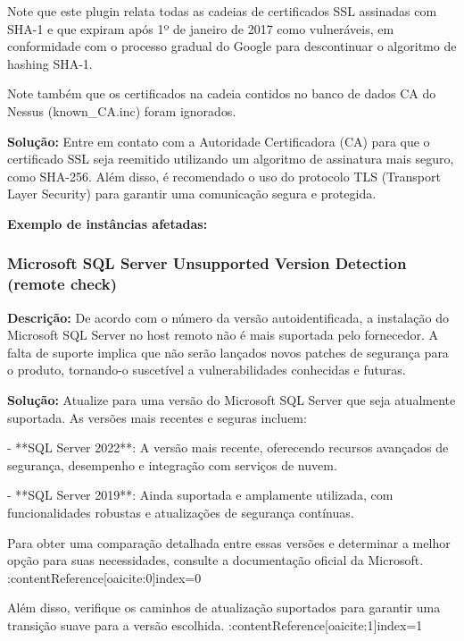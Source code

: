 \documentclass[a4paper,12pt]{article}
\begin{document}
Note que este plugin relata todas as cadeias de certificados SSL assinadas com SHA-1 e que expiram após 1º de janeiro de 2017 como vulneráveis, em conformidade com o processo gradual do Google para descontinuar o algoritmo de hashing SHA-1.

Note também que os certificados na cadeia contidos no banco de dados CA do Nessus (known_CA.inc) foram ignorados.

\textbf{Solução:}
Entre em contato com a Autoridade Certificadora (CA) para que o certificado SSL seja reemitido utilizando um algoritmo de assinatura mais seguro, como SHA-256. Além disso, é recomendado o uso do protocolo TLS (Transport Layer Security) para garantir uma comunicação segura e protegida.

\textbf{Exemplo de instâncias afetadas:}
\begin{itemize}
\end{itemize}


\subsubsection{Microsoft SQL Server Unsupported Version Detection (remote check)}

\textbf{Descrição:}  
De acordo com o número da versão autoidentificada, a instalação do Microsoft SQL Server no host remoto não é mais suportada pelo fornecedor. A falta de suporte implica que não serão lançados novos patches de segurança para o produto, tornando-o suscetível a vulnerabilidades conhecidas e futuras.

\textbf{Solução:}  
Atualize para uma versão do Microsoft SQL Server que seja atualmente suportada. As versões mais recentes e seguras incluem:

- **SQL Server 2022**: A versão mais recente, oferecendo recursos avançados de segurança, desempenho e integração com serviços de nuvem.

- **SQL Server 2019**: Ainda suportada e amplamente utilizada, com funcionalidades robustas e atualizações de segurança contínuas.

Para obter uma comparação detalhada entre essas versões e determinar a melhor opção para suas necessidades, consulte a documentação oficial da Microsoft. :contentReference[oaicite:0]{index=0}

Além disso, verifique os caminhos de atualização suportados para garantir uma transição suave para a versão escolhida. :contentReference[oaicite:1]{index=1}
\end{document}
